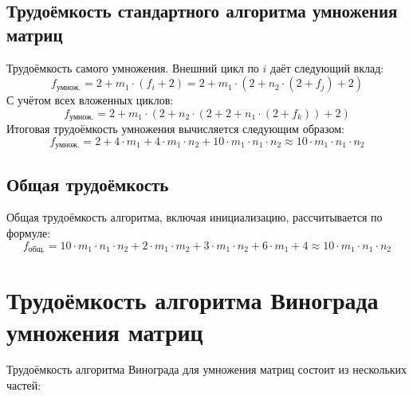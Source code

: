 \documentclass[a4paper, 12pt]{extreport}
\begin{document}
\subsection{Трудоёмкость стандартного алгоритма умножения матриц}

Трудоёмкость самого умножения. Внешний цикл по $i$ даёт следующий вклад:
\begin{equation}
f_{\text{умнож.}} = 2 + m_1 \cdot (f_i + 2) = 2 + m_1 \cdot (2 + n_2 \cdot (2 + f_j) + 2)
\end{equation}
С учётом всех вложенных циклов:
\begin{equation}
f_{\text{умнож.}} = 2 + m_1 \cdot (2 + n_2 \cdot (2 + 2 + n_1 \cdot (2 + f_k)) + 2)
\end{equation}
Итоговая трудоёмкость умножения вычисляется следующим образом:
\begin{equation}
f_{\text{умнож.}} = 2 + 4 \cdot m_1 + 4 \cdot m_1 \cdot n_2 + 10 \cdot m_1 \cdot n_1 \cdot n_2 \approx 10 \cdot m_1 \cdot n_1 \cdot n_2
\end{equation}

\subsection{Общая трудоёмкость}

Общая трудоёмкость алгоритма, включая инициализацию, рассчитывается по формуле:
\begin{equation}
f_{\text{общ.}} = 10 \cdot m_1 \cdot n_1 \cdot n_2 + 2 \cdot m_1 \cdot m_2 + 3 \cdot m_1 \cdot n_2 + 6 \cdot m_1 + 4 \approx 10 \cdot m_1 \cdot n_1 \cdot n_2
\end{equation}

\section{Трудоёмкость алгоритма Винограда умножения матриц}

Трудоёмкость алгоритма Винограда для умножения матриц состоит из нескольких частей:
\end{document}
